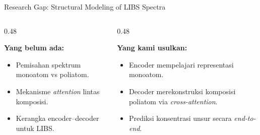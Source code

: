 \documentclass{beamer}
\begin{document}
\begin{frame}{Research Gap: Structural Modeling of LIBS Spectra}
  \vspace{0.4em}

  \begin{columns}[T,onlytextwidth]
    \begin{column}{0.48\textwidth}
      {\small
      \textbf{Yang belum ada:}
      \begin{itemize}\setlength{\itemsep}{2pt}
        \item Pemisahan spektrum monoatom vs poliatom.
        \item Mekanisme \textit{attention} lintas komposisi.
        \item Kerangka encoder--decoder untuk LIBS.
      \end{itemize}}
    \end{column}
    \begin{column}{0.48\textwidth}
      {\small
      \textbf{Yang kami usulkan:}
      \begin{itemize}\setlength{\itemsep}{2pt}
        \item Encoder mempelajari representasi monoatom.
        \item Decoder merekonstruksi komposisi poliatom via \textit{cross-attention}.
        \item Prediksi konsentrasi unsur secara \textit{end-to-end}.
      \end{itemize}}
    \end{column}
  \end{columns}
\end{frame}
\end{document}
